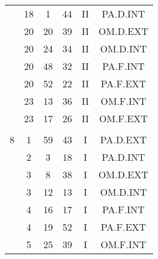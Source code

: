 \documentclass[12pt, a4paper]{article}
\begin{document}
\begin{multicols}{3}
{\begin{tabular}{c c c c c c}
	 	 	 	 & 18 & 1 & 44 & II & PA.D.INT\\%
	 	 	 	 & 20 & 20 & 39 & II & OM.D.EXT\\%
	 	 	 	 & 20 & 24 & 34 & II & OM.D.INT\\%
	 	 	 	 & 20 & 48 & 32 & II & PA.F.INT\\%
	 	 	 	 & 20 & 52 & 22 & II & PA.F.EXT\\%
	 	 	 	 & 23 & 13 & 36 & II & OM.F.INT\\%
	 	 	 	 & 23 & 17 & 26 & II & OM.F.EXT\\%
	 	 	 	 & & & & & \\%
	 	 	 	8 & 1 & 59 & 43 & I & PA.D.EXT\\%
	 	 	 	 & 2 & 3 & 18 & I & PA.D.INT\\%
	 	 	 	 & 3 & 8 & 38 & I & OM.D.EXT\\%
	 	 	 	 & 3 & 12 & 13 & I & OM.D.INT\\%
	 	 	 	 & 4 & 16 & 17 & I & PA.F.INT\\%
	 	 	 	 & 4 & 19 & 52 & I & PA.F.EXT\\%
	 	 	 	 & 5 & 25 & 39 & I & OM.F.INT\\%
	 	 \end{tabular}
 	}
\end{multicols}
\end{document}
